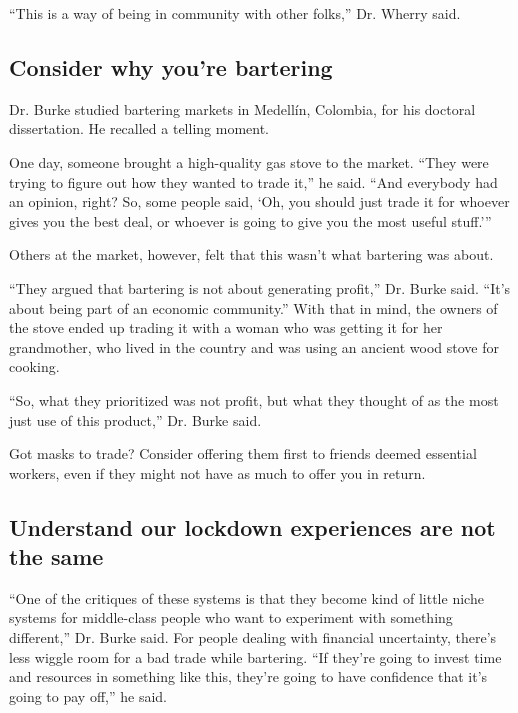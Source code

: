 ``This is a way of being in community with other folks,'' Dr. Wherry
said.

\hypertarget{consider-why-youre-bartering}{%
\subsection{Consider why you're
bartering}\label{consider-why-youre-bartering}}

Dr. Burke studied bartering markets in Medellín, Colombia, for his
doctoral dissertation. He recalled a telling moment.

One day, someone brought a high-quality gas stove to the market. ``They
were trying to figure out how they wanted to trade it,'' he said. ``And
everybody had an opinion, right? So, some people said, `Oh, you should
just trade it for whoever gives you the best deal, or whoever is going
to give you the most useful stuff.'''

Others at the market, however, felt that this wasn't what bartering was
about.

``They argued that bartering is not about generating profit,'' Dr. Burke
said. ``It's about being part of an economic community.'' With that in
mind, the owners of the stove ended up trading it with a woman who was
getting it for her grandmother, who lived in the country and was using
an ancient wood stove for cooking.

``So, what they prioritized was not profit, but what they thought of as
the most just use of this product,'' Dr. Burke said.

Got masks to trade? Consider offering them first to friends deemed
essential workers, even if they might not have as much to offer you in
return.

\hypertarget{understand-our-lockdown-experiences-are-not-the-same}{%
\subsection{Understand our lockdown experiences are not the
same}\label{understand-our-lockdown-experiences-are-not-the-same}}

``One of the critiques of these systems is that they become kind of
little niche systems for middle-class people who want to experiment with
something different,'' Dr. Burke said. For people dealing with financial
uncertainty, there's less wiggle room for a bad trade while bartering.
``If they're going to invest time and resources in something like this,
they're going to have confidence that it's going to pay off,'' he said.

